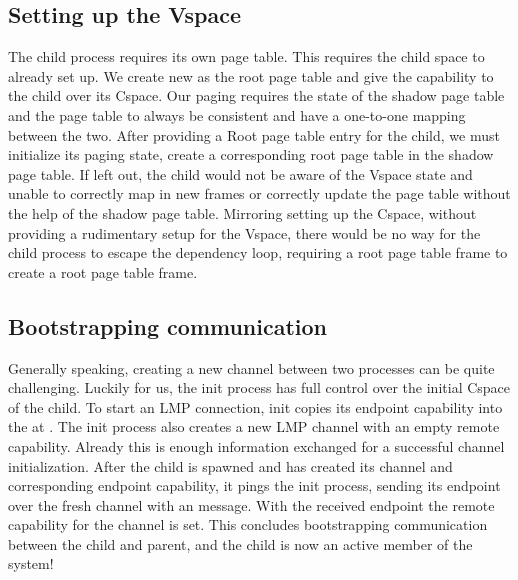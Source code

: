 \subsection{Setting up the Vspace}
The child process requires its own page table. This requires the child space to already set up. We create new 
as the root page table and give the capability to the child over its Cspace. Our paging requires the state of the shadow page table and the page table to always be consistent and have a one-to-one mapping between the two. After providing a Root page table entry for the child, we must initialize its paging state, create a corresponding root page table in the shadow page table. If left out, the child would not be aware of the Vspace state and unable to correctly map in new frames or correctly update the page table without the help of the shadow page table. Mirroring setting up the Cspace, without providing a rudimentary setup for the Vspace, there would be no way for the child process to escape the dependency loop, requiring a root page table frame to create a root page table frame. 


\subsection{Bootstrapping communication} \label{bootstrap_spawn}
Generally speaking, creating a new channel between two processes can be quite challenging. Luckily for us, the init process has full control over the initial Cspace of the child. To start an LMP connection, init copies its endpoint capability into the  at . The init process also creates a new LMP channel with an empty remote capability. Already this is enough information exchanged for a successful channel initialization. After the child is spawned and has created its channel and corresponding endpoint capability, it pings the init process, sending its endpoint over the fresh channel with an  message. With the received endpoint the remote capability for the channel is set. This concludes bootstrapping communication between the child and parent, and the child is now an active member of the system!     


